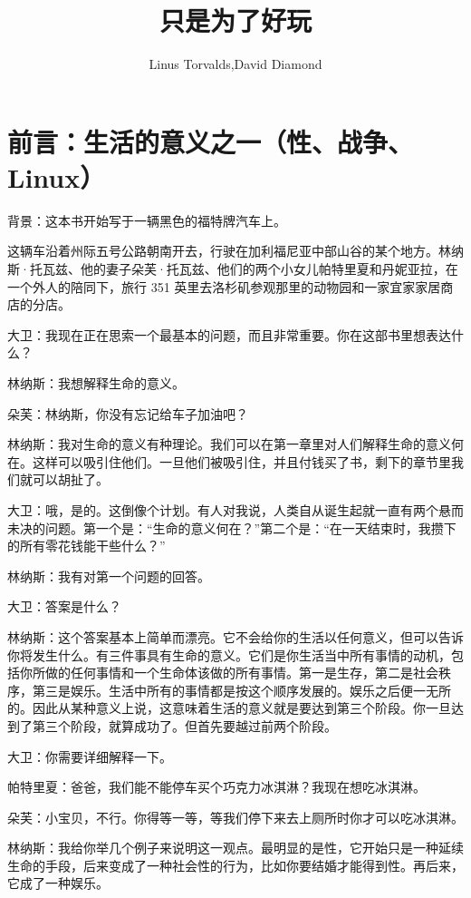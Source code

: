 \documentclass[12pt,UTF8]{ctexbook}
\title{\heiti\zihao{0} 只是为了好玩}
\author{Linus Torvalds,David Diamond}
\date{}
\begin{document}
\maketitle
\tableofcontents

\frontmatter

\chapter{前言：生活的意义之一（性、战争、Linux）}

背景：这本书开始写于一辆黑色的福特牌汽车上。

这辆车沿着州际五号公路朝南开去，行驶在加利福尼亚中部山谷的某个地方。林纳斯·托瓦兹、他的妻子朵芙·托瓦兹、他们的两个小女儿帕特里夏和丹妮亚拉，在一个外人的陪同下，旅行 351 英里去洛杉矶参观那里的动物园和一家宜家家居商店的分店。

大卫：我现在正在思索一个最基本的问题，而且非常重要。你在这部书里想表达什么？

林纳斯：我想解释生命的意义。

朵芙：林纳斯，你没有忘记给车子加油吧？

林纳斯：我对生命的意义有种理论。我们可以在第一章里对人们解释生命的意义何在。这样可以吸引住他们。一旦他们被吸引住，并且付钱买了书，剩下的章节里我们就可以胡扯了。

大卫：哦，是的。这倒像个计划。有人对我说，人类自从诞生起就一直有两个悬而未决的问题。第一个是：“生命的意义何在？”第二个是：“在一天结束时，我攒下的所有零花钱能干些什么？”

林纳斯：我有对第一个问题的回答。

大卫：答案是什么？

林纳斯：这个答案基本上简单而漂亮。它不会给你的生活以任何意义，但可以告诉你将发生什么。有三件事具有生命的意义。它们是你生活当中所有事情的动机，包括你所做的任何事情和一个生命体该做的所有事情。第一是生存，第二是社会秩序，第三是娱乐。生活中所有的事情都是按这个顺序发展的。娱乐之后便一无所的。因此从某种意义上说，这意味着生活的意义就是要达到第三个阶段。你一旦达到了第三个阶段，就算成功了。但首先要越过前两个阶段。

大卫：你需要详细解释一下。

帕特里夏：爸爸，我们能不能停车买个巧克力冰淇淋？我现在想吃冰淇淋。

朵芙：小宝贝，不行。你得等一等，等我们停下来去上厕所时你才可以吃冰淇淋。

林纳斯：我给你举几个例子来说明这一观点。最明显的是性，它开始只是一种延续生命的手段，后来变成了一种社会性的行为，比如你要结婚才能得到性。再后来，它成了一种娱乐。
\end{document}
